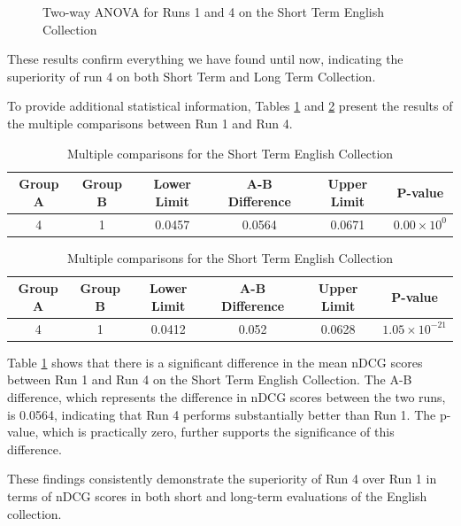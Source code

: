 \begin{figure}[!h]
\begin{subfigure}[b]{0.49\textwidth}
        \label{fig:st_anova_eng_ap}
    \end{subfigure}
    \caption{Two-way ANOVA for Runs 1 and 4 on the Short Term English Collection}
    \label{fig:st_anova_eng}
\end{figure}
 
These results confirm everything we have found until now, indicating the superiority of run 4 on both Short Term and Long Term Collection.

To provide additional statistical information, Tables \ref{table:st_anova_eng} and \ref{table:st_anova_eng_ap} present the results of the multiple comparisons between Run 1 and Run 4.

\begin{table}[!h]
    \centering
    \caption{Multiple comparisons for the Short Term English Collection}
    \label{table:st_anova_eng}
    \begin{tabular}{cccccc}
    \hline
    Group A & Group B & Lower Limit & A-B Difference & Upper Limit & P-value \\
    \hline
    4 & 1 & 0.0457 & 0.0564 & 0.0671 & $0.00 \times 10^{0}$ \\
    \hline
    \end{tabular}
\end{table}

\begin{table}[!h]
    \centering
    \caption{Multiple comparisons for the Short Term English Collection}
    \label{table:st_anova_eng_ap}
    \begin{tabular}{cccccc}
    \hline
    Group A & Group B & Lower Limit & A-B Difference & Upper Limit & P-value \\
    \hline
    4 & 1 & 0.0412 & 0.052 & 0.0628 & $1.05 \times 10^{-21}$ \\
    \hline
    \end{tabular}
\end{table}

Table \ref{table:st_anova_eng} shows that there is a significant difference in the mean \ac{nDCG} scores between Run 1 and Run 4 on the Short Term English Collection. 
The A-B difference, which represents the difference in \ac{nDCG} scores between the two runs, is 0.0564, indicating that Run 4 performs substantially better than Run 1. 
The p-value, which is practically zero, further supports the significance of this difference.

These findings consistently demonstrate the superiority of Run 4 over Run 1 in terms of \ac{nDCG} scores in both short and long-term evaluations of the English collection.


